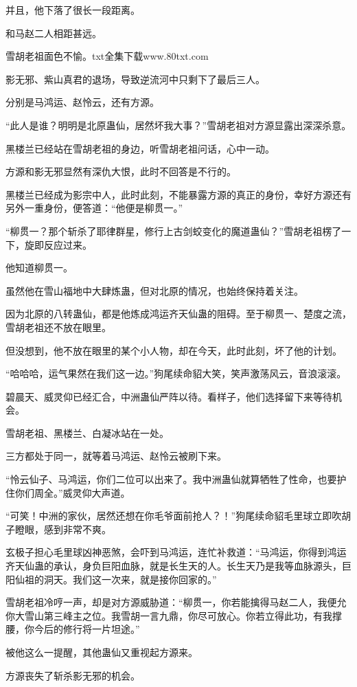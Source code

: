 \begin{this_body}
并且，他下落了很长一段距离。

和马赵二人相距甚远。

雪胡老祖面色不愉。txt全集下载www.80txt.com

影无邪、紫山真君的退场，导致逆流河中只剩下了最后三人。

分别是马鸿运、赵怜云，还有方源。

“此人是谁？明明是北原蛊仙，居然坏我大事？”雪胡老祖对方源显露出深深杀意。

黑楼兰已经站在雪胡老祖的身边，听雪胡老祖问话，心中一动。

方源和影无邪显然有深仇大恨，此时不回答是不行的。

黑楼兰已经成为影宗中人，此时此刻，不能暴露方源的真正的身份，幸好方源还有另外一重身份，便答道：“他便是柳贯一。”

“柳贯一？那个斩杀了耶律群星，修行上古剑蛟变化的魔道蛊仙？”雪胡老祖楞了一下，旋即反应过来。

他知道柳贯一。

虽然他在雪山福地中大肆炼蛊，但对北原的情况，也始终保持着关注。

因为北原的八转蛊仙，都是他炼成鸿运齐天仙蛊的阻碍。至于柳贯一、楚度之流，雪胡老祖还不放在眼里。

但没想到，他不放在眼里的某个小人物，却在今天，此时此刻，坏了他的计划。

“哈哈哈，运气果然在我们这一边。”狗尾续命貂大笑，笑声激荡风云，音浪滚滚。

碧晨天、威灵仰已经汇合，中洲蛊仙严阵以待。看样子，他们选择留下来等待机会。

雪胡老祖、黑楼兰、白凝冰站在一处。

三方都处于同一，就等着马鸿运、赵怜云被刷下来。

“怜云仙子、马鸿运，你们二位可以出来了。我中洲蛊仙就算牺牲了性命，也要护住你们周全。”威灵仰大声道。

“可笑！中洲的家伙，居然还想在你毛爷面前抢人？！”狗尾续命貂毛里球立即吹胡子瞪眼，感到非常不爽。

玄极子担心毛里球凶神恶煞，会吓到马鸿运，连忙补救道：“马鸿运，你得到鸿运齐天仙蛊的承认，身负巨阳血脉，就是长生天的人。长生天乃是我等血脉源头，巨阳仙祖的洞天。我们这一次来，就是接你回家的。”

雪胡老祖冷哼一声，却是对方源威胁道：“柳贯一，你若能擒得马赵二人，我便允你大雪山第三峰主之位。我雪胡一言九鼎，你尽可放心。你若立得此功，有我撑腰，你今后的修行将一片坦途。”

被他这么一提醒，其他蛊仙又重视起方源来。

方源丧失了斩杀影无邪的机会。


\end{this_body}
